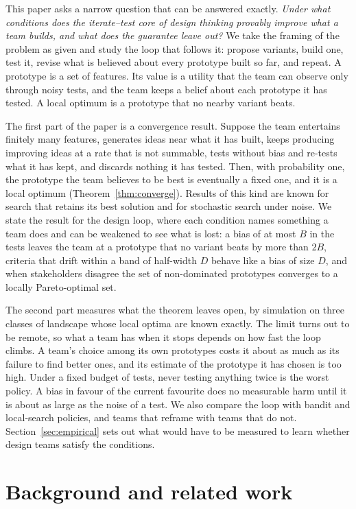 \documentclass[preprint,review,11pt,authoryear]{elsarticle}
\theoremstyle{definition}
\begin{document}
This paper asks a narrow question that can be answered exactly. \emph{Under what conditions does the iterate--test core of design thinking provably improve what a team builds, and what does the guarantee leave out?} We take the framing of the problem as given and study the loop that follows it: propose variants, build one, test it, revise what is believed about every prototype built so far, and repeat. A prototype is a set of features. Its value is a utility that the team can observe only through noisy tests, and the team keeps a belief about each prototype it has tested. A local optimum is a prototype that no nearby variant beats.

The first part of the paper is a convergence result. Suppose the team entertains finitely many features, generates ideas near what it has built, keeps producing improving ideas at a rate that is not summable, tests without bias and re-tests what it has kept, and discards nothing it has tested. Then, with probability one, the prototype the team believes to be best is eventually a fixed one, and it is a local optimum (Theorem~\ref{thm:converge}). Results of this kind are known for search that retains its best solution and for stochastic search under noise. We state the result for the design loop, where each condition names something a team does and can be weakened to see what is lost: a bias of at most $B$ in the tests leaves the team at a prototype that no variant beats by more than $2B$, criteria that drift within a band of half-width $D$ behave like a bias of size $D$, and when stakeholders disagree the set of non-dominated prototypes converges to a locally Pareto-optimal set.

The second part measures what the theorem leaves open, by simulation on three classes of landscape whose local optima are known exactly. The limit turns out to be remote, so what a team has when it stops depends on how fast the loop climbs. A team's choice among its own prototypes costs it about as much as its failure to find better ones, and its estimate of the prototype it has chosen is too high. Under a fixed budget of tests, never testing anything twice is the worst policy. A bias in favour of the current favourite does no measurable harm until it is about as large as the noise of a test. We also compare the loop with bandit and local-search policies, and teams that reframe with teams that do not. Section~\ref{sec:empirical} sets out what would have to be measured to learn whether design teams satisfy the conditions.

\section{Background and related work}
\label{sec:related}
\end{document}
